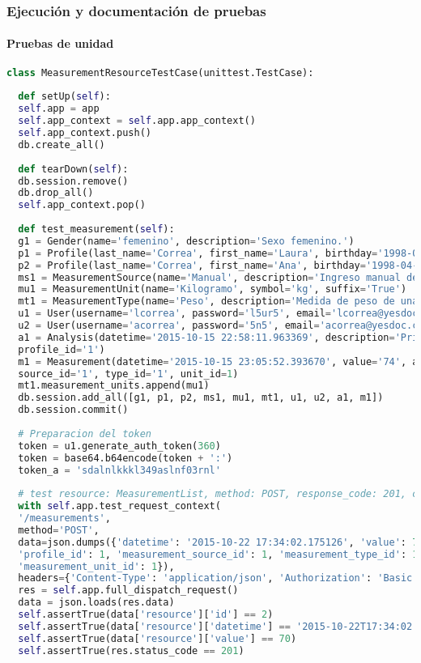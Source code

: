   \subsubsection{Ejecución y documentación de pruebas}
  
  \paragraph{Pruebas de unidad}
  
  \begin{lstlisting}[language=Python ]
  class MeasurementResourceTestCase(unittest.TestCase):
  
  def setUp(self):
  self.app = app
  self.app_context = self.app.app_context()
  self.app_context.push()
  db.create_all()
  
  def tearDown(self):
  db.session.remove()
  db.drop_all()
  self.app_context.pop()
  
  def test_measurement(self):
  g1 = Gender(name='femenino', description='Sexo femenino.')
  p1 = Profile(last_name='Correa', first_name='Laura', birthday='1998-08-20', gender_id='1')
  p2 = Profile(last_name='Correa', first_name='Ana', birthday='1998-04-10', gender_id='1')
  ms1 = MeasurementSource(name='Manual', description='Ingreso manual de la medida.')
  mu1 = MeasurementUnit(name='Kilogramo', symbol='kg', suffix='True')
  mt1 = MeasurementType(name='Peso', description='Medida de peso de una persona')
  u1 = User(username='lcorrea', password='l5ur5', email='lcorrea@yesdoc.com', profile_id='1')
  u2 = User(username='acorrea', password='5n5', email='acorrea@yesdoc.com', profile_id='2')
  a1 = Analysis(datetime='2015-10-15 22:58:11.963369', description='Primer toma de medidas de peso',
  profile_id='1')
  m1 = Measurement(datetime='2015-10-15 23:05:52.393670', value='74', analysis_id='1', profile_id='1',
  source_id='1', type_id='1', unit_id=1)
  mt1.measurement_units.append(mu1)
  db.session.add_all([g1, p1, p2, ms1, mu1, mt1, u1, u2, a1, m1])
  db.session.commit()
  
  # Preparacion del token
  token = u1.generate_auth_token(360)
  token = base64.b64encode(token + ':')
  token_a = 'sdalnlkkkl349aslnf03rnl'
  
  # test resource: MeasurementList, method: POST, response_code: 201, con autorizacion
  with self.app.test_request_context(
  '/measurements',
  method='POST',
  data=json.dumps({'datetime': '2015-10-22 17:34:02.175126', 'value': 70, 'analysis_id': 1,
  'profile_id': 1, 'measurement_source_id': 1, 'measurement_type_id': 1,
  'measurement_unit_id': 1}),
  headers={'Content-Type': 'application/json', 'Authorization': 'Basic ' + token}):
  res = self.app.full_dispatch_request()
  data = json.loads(res.data)
  self.assertTrue(data['resource']['id'] == 2)
  self.assertTrue(data['resource']['datetime'] == '2015-10-22T17:34:02.175126')
  self.assertTrue(data['resource']['value'] == 70)
  self.assertTrue(res.status_code == 201)
  

\end{lstlisting}
